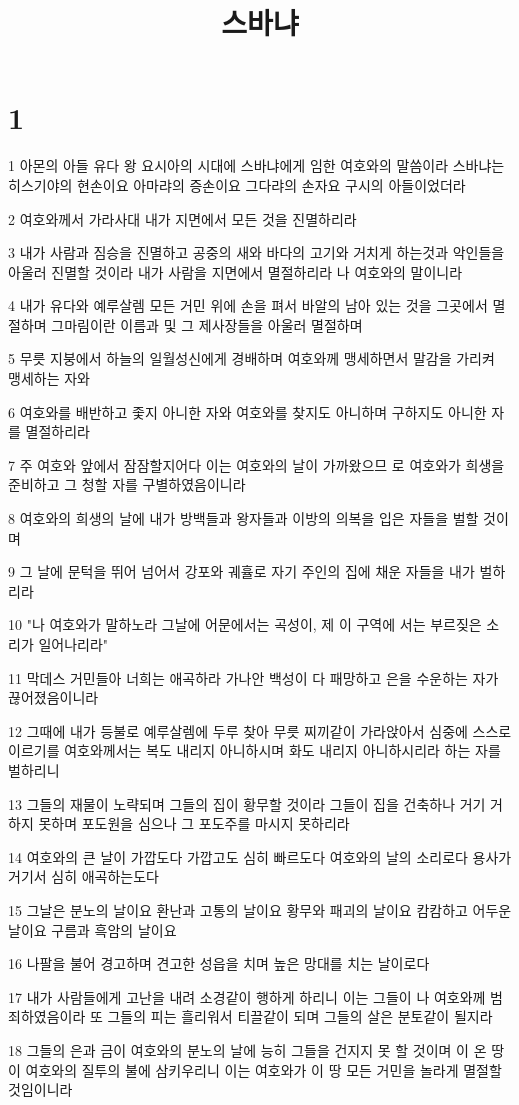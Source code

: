 

\title{스바냐}


\chapter{1}

\par 1 아몬의 아들 유다 왕 요시아의 시대에 스바냐에게 임한 여호와의 말씀이라 스바냐는 히스기야의 현손이요 아마랴의 증손이요 그다랴의 손자요 구시의 아들이었더라
\par 2 여호와께서 가라사대 내가 지면에서 모든 것을 진멸하리라
\par 3 내가 사람과 짐승을 진멸하고 공중의 새와 바다의 고기와 거치게 하는것과 악인들을 아울러 진멸할 것이라 내가 사람을 지면에서 멸절하리라 나 여호와의 말이니라
\par 4 내가 유다와 예루살렘 모든 거민 위에 손을 펴서 바알의 남아 있는 것을 그곳에서 멸절하며 그마림이란 이름과 및 그 제사장들을 아울러 멸절하며
\par 5 무릇 지붕에서 하늘의 일월성신에게 경배하며 여호와께 맹세하면서 말감을 가리켜 맹세하는 자와
\par 6 여호와를 배반하고 좇지 아니한 자와 여호와를 찾지도 아니하며 구하지도 아니한 자를 멸절하리라
\par 7 주 여호와 앞에서 잠잠할지어다 이는 여호와의 날이 가까왔으므 로 여호와가 희생을 준비하고 그 청할 자를 구별하였음이니라
\par 8 여호와의 희생의 날에 내가 방백들과 왕자들과 이방의 의복을 입은 자들을 벌할 것이며
\par 9 그 날에 문턱을 뛰어 넘어서 강포와 궤휼로 자기 주인의 집에 채운 자들을 내가 벌하리라
\par 10 "나 여호와가 말하노라 그날에 어문에서는 곡성이, 제 이 구역에 서는 부르짖은 소리가 일어나리라"
\par 11 막데스 거민들아 너희는 애곡하라 가나안 백성이 다 패망하고 은을 수운하는 자가 끊어졌음이니라
\par 12 그때에 내가 등불로 예루살렘에 두루 찾아 무릇 찌끼같이 가라앉아서 심중에 스스로 이르기를 여호와께서는 복도 내리지 아니하시며 화도 내리지 아니하시리라 하는 자를 벌하리니
\par 13 그들의 재물이 노략되며 그들의 집이 황무할 것이라 그들이 집을 건축하나 거기 거하지 못하며 포도원을 심으나 그 포도주를 마시지 못하리라
\par 14 여호와의 큰 날이 가깝도다 가깝고도 심히 빠르도다 여호와의 날의 소리로다 용사가 거기서 심히 애곡하는도다
\par 15 그날은 분노의 날이요 환난과 고통의 날이요 황무와 패괴의 날이요 캄캄하고 어두운 날이요 구름과 흑암의 날이요
\par 16 나팔을 불어 경고하며 견고한 성읍을 치며 높은 망대를 치는 날이로다
\par 17 내가 사람들에게 고난을 내려 소경같이 행하게 하리니 이는 그들이 나 여호와께 범죄하였음이라 또 그들의 피는 흘리워서 티끌같이 되며 그들의 살은 분토같이 될지라
\par 18 그들의 은과 금이 여호와의 분노의 날에 능히 그들을 건지지 못 할 것이며 이 온 땅이 여호와의 질투의 불에 삼키우리니 이는 여호와가 이 땅 모든 거민을 놀라게 멸절할 것임이니라

